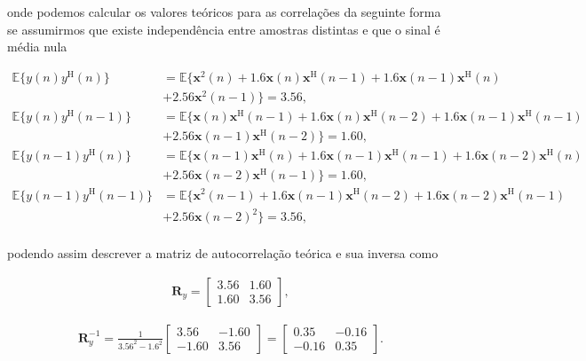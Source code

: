 \documentclass[a4paper,10pt]{article}
\begin{document}
\begin{enumerate}
\begin{enumerate}
						onde podemos calcular os valores teóricos para as correlações da seguinte forma se assumirmos que existe independência entre amostras distintas e que o sinal é média nula 
						
						\begin{align*}
							\mathbb{E}\{y(n)y^{\text{H}}(n)\} &= \mathbb{E}\{ \mathbf{x}^{2}(n) + 1.6 \mathbf{x}(n) \mathbf{x}^{\text{H}}(n - 1) + 1.6 \mathbf{x}(n - 1) \mathbf{x}^{\text{H}} (n) \\
							&+ 2.56 \mathbf{x}^{2}(n - 1) \} = 3.56, \\
							\mathbb{E}\{y(n)y^{\text{H}}(n - 1)\} &= \mathbb{E}\{ \mathbf{x}(n) \mathbf{x}^{\text{H}}(n - 1) + 1.6 \mathbf{x}(n) \mathbf{x}^{\text{H}}(n - 2) + 1.6 \mathbf{x}(n - 1) \mathbf{x}^{\text{H}} (n - 1) \\ 
							&+ 2.56 \mathbf{x}(n - 1) \mathbf{x}^{\text{H}}(n - 2) \} = 1.60, \\
							\mathbb{E}\{y(n - 1)y^{\text{H}}(n)\} &= \mathbb{E}\{ \mathbf{x}(n - 1) \mathbf{x}^{\text{H}}(n) + 1.6 \mathbf{x}(n - 1) \mathbf{x}^{\text{H}}(n - 1) + 1.6 \mathbf{x}(n - 2) \mathbf{x}^{\text{H}} (n) \\ 
							&+ 2.56 \mathbf{x}(n - 2) \mathbf{x}^{\text{H}}(n - 1) \} = 1.60, \\
							\mathbb{E}\{y(n - 1)y^{\text{H}}(n - 1)\} &= \mathbb{E}\{ \mathbf{x}^{2}(n - 1) + 1.6 \mathbf{x}(n - 1) \mathbf{x}^{\text{H}}(n - 2) + 1.6 \mathbf{x}(n - 2) \mathbf{x}^{\text{H}} (n - 1) \\ 
							&+ 2.56 \mathbf{x}(n - 2)^{2} \} = 3.56, \\
						\end{align*}
						
						podendo assim descrever a matriz de autocorrelação teórica e sua inversa como
						
						\begin{align}
							\mathbf{R}_{y} =
							\begin{bmatrix}
								3.56 & 1.60 \\
								1.60 & 3.56
							\end{bmatrix},
						\end{align}
						
						\begin{align}
							\mathbf{R}^{-1}_{y} = \frac{1}{3.56^{2} - 1.6^{2}}
							\begin{bmatrix}
								3.56 &  -1.60 \\
								-1.60 & 3.56
							\end{bmatrix} =
							\begin{bmatrix}
								0.35 &  -0.16 \\
								-0.16 & 0.35
							\end{bmatrix}.
						\end{align}
						

\end{enumerate}
\end{enumerate}
\end{document}
